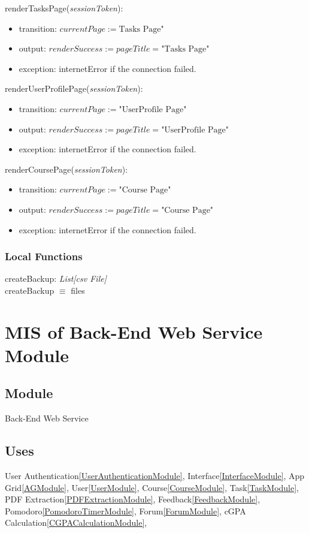 \documentclass[12pt, titlepage]{article}
\begin{document}
\noindent renderTasksPage(\textit{sessionToken}):
\begin{itemize}
\item transition: \(currentPage := \text{Tasks Page"}\)
\item output: \(renderSuccess := pageTitle = \text{"Tasks Page"}\)
\item exception: internetError if the connection failed.
\end{itemize}

\noindent renderUserProfilePage(\textit{sessionToken}):
\begin{itemize}
\item transition: \(currentPage := \text{"UserProfile Page"}\)
\item output: \(renderSuccess := pageTitle = \text{"UserProfile Page"}\)
\item exception: internetError if the connection failed.
\end{itemize}

\noindent renderCoursePage(\textit{sessionToken}):
\begin{itemize}
\item transition: \(currentPage := \text{"Course Page"}\)
\item output: \(renderSuccess := pageTitle = \text{"Course Page"}\)
\item exception: internetError if the connection failed.
\end{itemize}


\subsubsection{Local Functions}
\noindent createBackup:  \textit{List[csv File]} \\
\noindent createBackup $\equiv$ files


\newpage
\section{MIS of Back-End Web Service Module} \label{BackEndWebServiceModule}

\subsection{Module}
Back-End Web Service

\subsection{Uses}
User Authentication\ref{UserAuthenticationModule}, Interface\ref{InterfaceModule}, App Grid\ref{AGModule}, User\ref{UserModule}, Course\ref{CourseModule}, Task\ref{TaskModule}, PDF Extraction\ref{PDFExtractionModule}, Feedback\ref{FeedbackModule}, Pomodoro\ref{PomodoroTimerModule}, Forum\ref{ForumModule}, cGPA Calculation\ref{CGPACalculationModule}, 
\
\end{document}

